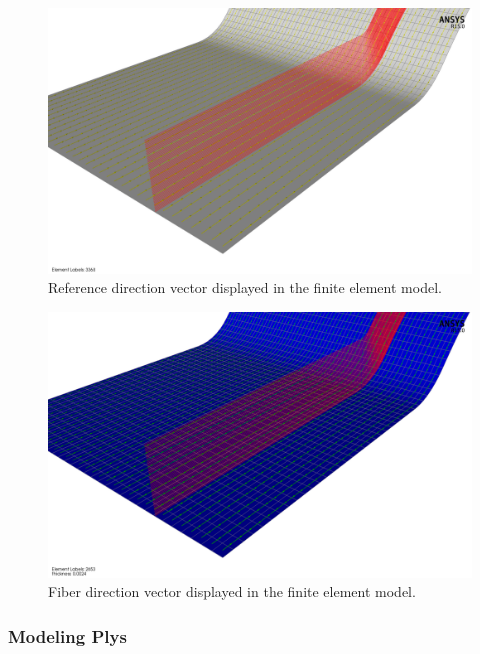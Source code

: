 \begin{figure}[htp]
\centering
\includegraphics[width=1\textwidth]{./figures/fea/fea-acp-reference-direction}
\caption{Reference direction vector displayed in the finite element model.}
\label{fig:fea-acp-reference-direction}
\end{figure}

\begin{figure}[htp]
\centering
\includegraphics[width=1\textwidth]{./figures/fea/fea-acp-fiber-direction}
\caption{Fiber direction vector displayed in the finite element model.}
\label{fig:fea-acp-fiber-direction}
\end{figure}

\clearpage

\subsubsection{Modeling Plys}

\indent

